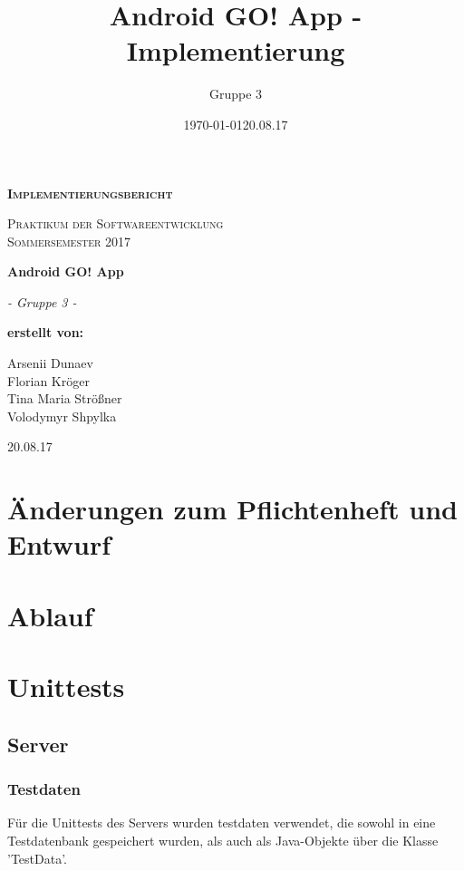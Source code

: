 \documentclass[11pt,a4paper]{scrartcl}
\date{\today}
\title{Android GO! App - Implementierung}
\author{Gruppe 3}
\date{20.08.17}
\begin{document}
\begin{titlepage}
	\begin{center}
	{\scshape\LARGE \bfseries Implementierungsbericht \par}
	\vspace{1cm}
	{\scshape\Large Praktikum der Softwareentwicklung \\ Sommersemester 2017\par}
	\vspace{1.5cm}
	{\huge\bfseries Android GO! App\par}
	\vspace{2cm}
	{\Large\itshape - Gruppe 3 -\par}
	\vfill
	{\bfseries erstellt von:\par}
	Arsenii Dunaev \\
	Florian Kröger \\
	Tina Maria Strößner \\
	Volodymyr Shpylka \\	
	\vfill
	{\large 20.08.17 \par}	
	\end{center}
\end{titlepage}

\newpage

\tableofcontents

\newpage

\section{Änderungen zum Pflichtenheft und Entwurf}

\newpage

\section{Ablauf}

\newpage

\section{Unittests}

\subsection{Server}

\subsubsection{Testdaten}\label{Testdaten}
Für die Unittests des Servers wurden testdaten verwendet, die sowohl in eine Testdatenbank gespeichert wurden, als auch als Java-Objekte über die Klasse 'TestData'.
\end{document}
